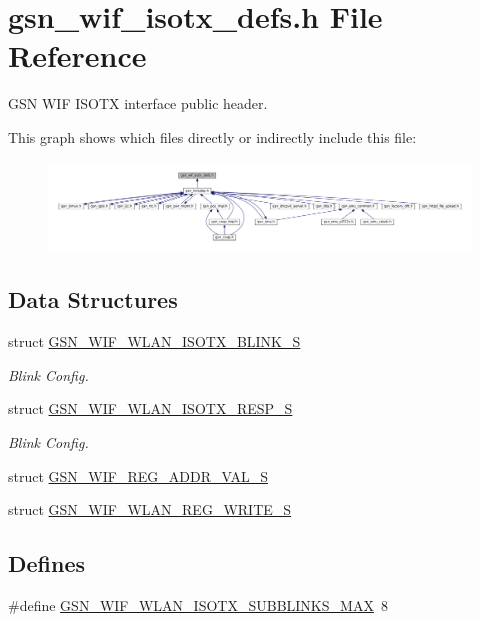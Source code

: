 \hypertarget{a00611}{
\section{gsn\_\-wif\_\-isotx\_\-defs.h File Reference}
\label{a00611}
}


GSN WIF ISOTX interface public header.  


This graph shows which files directly or indirectly include this file:
\nopagebreak
\begin{figure}[H]
\begin{center}
\leavevmode
\includegraphics[width=400pt]{a00858}
\end{center}
\end{figure}
\subsection*{Data Structures}
\begin{DoxyCompactItemize}
\item 
struct \hyperlink{a00383}{GSN\_\-WIF\_\-WLAN\_\-ISOTX\_\-BLINK\_\-S}
\begin{DoxyCompactList}\small\item\em Blink Config. \end{DoxyCompactList}\item 
struct \hyperlink{a00384}{GSN\_\-WIF\_\-WLAN\_\-ISOTX\_\-RESP\_\-S}
\begin{DoxyCompactList}\small\item\em Blink Config. \end{DoxyCompactList}\item 
struct \hyperlink{a00343}{GSN\_\-WIF\_\-REG\_\-ADDR\_\-VAL\_\-S}
\item 
struct \hyperlink{a00394}{GSN\_\-WIF\_\-WLAN\_\-REG\_\-WRITE\_\-S}
\end{DoxyCompactItemize}
\subsection*{Defines}
\begin{DoxyCompactItemize}
\item 
\#define \hyperlink{a00611_a65dca056006c9a81dd956396702f505f}{GSN\_\-WIF\_\-WLAN\_\-ISOTX\_\-SUBBLINKS\_\-MAX}~8
\end{DoxyCompactItemize}
